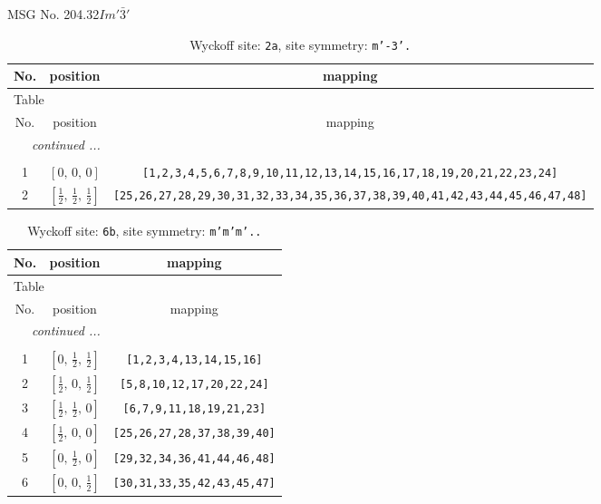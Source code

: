 \documentclass[fleqn,8pt]{jsarticle}
\begin{document}
\setcounter{MaxMatrixCols}{32}

\renewcommand{\tablename}{Table~}
\renewcommand{\figurename}{Figure~}
\begin{center}
\LARGE
MSG No. 204.32\quad$Im'\bar{3}'$
\end{center}
\renewcommand{\arraystretch}{1.2}
\begin{longtable}{ccc}
\caption{Wyckoff site: {\tt 2a}, site symmetry: {\tt m'-3'.}}
 \\
 \hline \hline
No. & position & mapping \\ \hline \endfirsthead

\multicolumn{2}{l}{\tablename\ \thetable{}} \\
 \hline \hline
No. & position & mapping \\ \hline \endhead

 \hline \hline
\multicolumn{2}{r}{\footnotesize\it continued ...} \\ \endfoot

 \hline \hline
\multicolumn{2}{r}{} \\ \endlastfoot

1 & $\left[ 0,\, 0,\, 0 \right]$ & {\tt [1,2,3,4,5,6,7,8,9,10,11,12,13,14,15,16,17,18,19,20,21,22,23,24]} \\ \hline
2 & $\left[ \frac{1}{2},\, \frac{1}{2},\, \frac{1}{2} \right]$ & {\tt [25,26,27,28,29,30,31,32,33,34,35,36,37,38,39,40,41,42,43,44,45,46,47,48]} \\
\end{longtable}
\renewcommand{\arraystretch}{1.2}
\begin{longtable}{ccc}
\caption{Wyckoff site: {\tt 6b}, site symmetry: {\tt m'm'm'..}}
 \\
 \hline \hline
No. & position & mapping \\ \hline \endfirsthead

\multicolumn{2}{l}{\tablename\ \thetable{}} \\
 \hline \hline
No. & position & mapping \\ \hline \endhead

 \hline \hline
\multicolumn{2}{r}{\footnotesize\it continued ...} \\ \endfoot

 \hline \hline
\multicolumn{2}{r}{} \\ \endlastfoot

1 & $\left[ 0,\, \frac{1}{2},\, \frac{1}{2} \right]$ & {\tt [1,2,3,4,13,14,15,16]} \\ \hline
2 & $\left[ \frac{1}{2},\, 0,\, \frac{1}{2} \right]$ & {\tt [5,8,10,12,17,20,22,24]} \\ \hline
3 & $\left[ \frac{1}{2},\, \frac{1}{2},\, 0 \right]$ & {\tt [6,7,9,11,18,19,21,23]} \\ \hline
4 & $\left[ \frac{1}{2},\, 0,\, 0 \right]$ & {\tt [25,26,27,28,37,38,39,40]} \\ \hline
5 & $\left[ 0,\, \frac{1}{2},\, 0 \right]$ & {\tt [29,32,34,36,41,44,46,48]} \\ \hline
6 & $\left[ 0,\, 0,\, \frac{1}{2} \right]$ & {\tt [30,31,33,35,42,43,45,47]} \\
\end{longtable}
\end{document}
